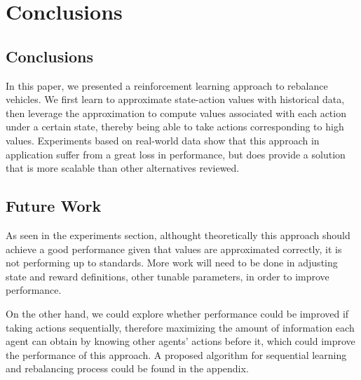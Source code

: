 \documentclass[letterpaper, 10 pt, conference]{ieeeconf}  %
\begin{document}
\addtolength{\textheight}{-3cm}   %

\section{Conclusions}
\subsection{Conclusions}
In this paper, we presented a reinforcement learning approach to rebalance vehicles. We first learn to approximate state-action values with historical data, then leverage the approximation to compute values associated with each action under a certain state, thereby being able to take actions corresponding to high values. Experiments based on real-world data show that this approach in application suffer from a great loss in performance, but does provide a solution that is more scalable than other alternatives reviewed. 

\subsection{Future Work}
As seen in the experiments section, althought theoretically this approach should achieve a good performance given that values are approximated correctly, it is not performing up to standards. More work will need to be done in adjusting state and reward definitions, other tunable parameters, in order to improve performance. 

On the other hand, we could explore whether performance could be improved if taking actions sequentially, therefore maximizing the amount of information each agent can obtain by knowing other agents' actions before it, which could improve the performance of this approach. A proposed algorithm for sequential learning and rebalancing process could be found in the appendix. 
\end{document}
